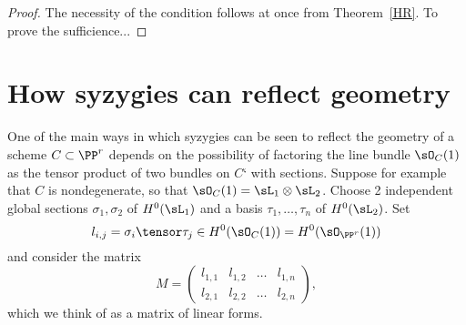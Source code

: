 \begin{proof}
The necessity of the condition follows at once from Theorem~\ref{HR}. To prove the sufficience...
\end{proof}
%
%
%
%
%
%




\section{How syzygies can reflect geometry}\label{syzy and geom}

One of the main ways in which syzygies can be seen to reflect the geometry of a scheme $C\subset \PP^r$
depends on the possibility of factoring the line bundle $\sO_C(1)$ as the tensor product of two bundles on $C$` with sections. Suppose for example that $C$ is nondegenerate, 
so that  $\sO_C(1) = \sL_1\otimes \sL_2$. Choose 2 independent global sections
$\sigma_1, \sigma_2$ of  $H^0(\sL_1)$ and a basis $\tau_1,\dots, \tau_n$ of $H^0(\sL_2)$. Set
$$
l_{i,j}= \sigma_i\tensor \tau_j \in H^0(\sO_C(1)) = H^0(\sO_{\PP^r}(1))
$$ and consider the matrix 
$$
M = 
\begin{pmatrix}
 l_{1,1}&l_{1,2}&\dots&l_{1,n}\\
  l_{2,1}&l_{2,2}&\dots&l_{2,n}
\end{pmatrix},
$$
which we think of as a matrix of linear forms. 

